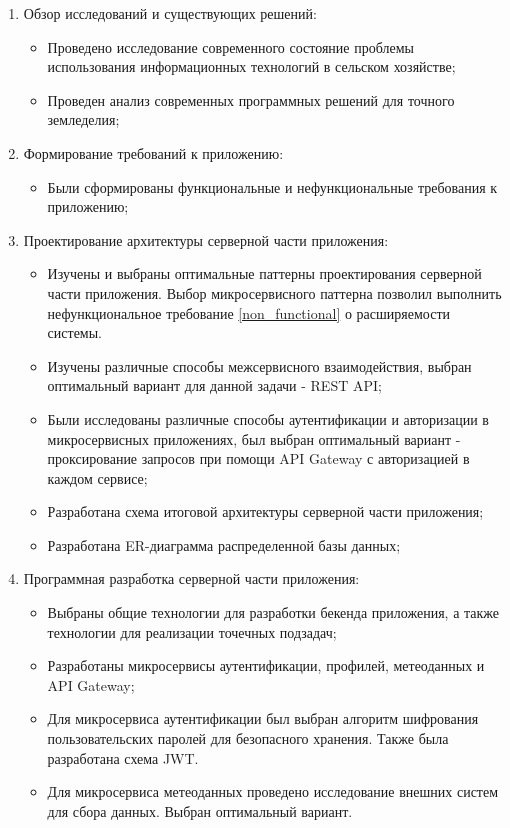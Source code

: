 \begin{enumerate}
    \item Обзор исследований и существующих решений:
    
    \begin{itemize}
    \item Проведено исследование современного состояние проблемы использования информационных технологий в сельском хозяйстве;
    \item Проведен анализ современных программных решений для точного земледелия;
    \end{itemize}

    \item Формирование требований к приложению:
    \begin{itemize}
    \item Были сформированы функциональные и нефункциональные требования к приложению;
    \end{itemize}

    \item Проектирование архитектуры серверной части приложения:
    \begin{itemize}
    \item Изучены и выбраны оптимальные паттерны проектирования серверной части приложения. Выбор микросервисного паттерна позволил выполнить нефункциональное требование \ref{non_functional} о расширяемости системы.
    \item Изучены различные способы межсервисного взаимодействия, выбран оптимальный вариант для данной задачи - REST API;
    \item Были исследованы различные способы аутентификации и авторизации в микросервисных приложениях, был выбран оптимальный вариант - проксирование запросов при помощи API Gateway с авторизацией в каждом сервисе;
    \item Разработана схема итоговой архитектуры серверной части приложения;
    \item Разработана ER-диаграмма распределенной базы данных;
    \end{itemize}

    \item Программная разработка серверной части приложения:
    \begin{itemize}
    \item Выбраны общие технологии для разработки бекенда приложения, а также технологии для реализации точечных подзадач;
    \item Разработаны микросервисы аутентификации, профилей, метеоданных и API Gateway;
    \item Для микросервиса аутентификации был выбран алгоритм шифрования пользовательских паролей для безопасного хранения. Также была разработана схема JWT.
    \item Для микросервиса метеоданных проведено исследование внешних систем для сбора данных. Выбран оптимальный вариант. 
    \end{itemize}


\end{enumerate}
